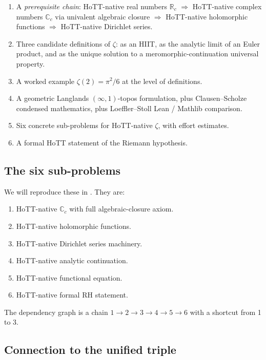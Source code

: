 \documentclass[12pt]{article}
\theoremstyle{definition}
\theoremstyle{remark}
\newcommand{\R}{\mathbb{R}}
\newcommand{\C}{\mathbb{C}}
\newcommand{\Rc}{\R_{c}}
\newcommand{\Cc}{\C_{c}}
\begin{document}
\begin{enumerate}[leftmargin=*]
\item A \emph{prerequisite chain}: HoTT-native real numbers $\Rc$
      $\Rightarrow$ HoTT-native complex numbers $\Cc$ via univalent
      algebraic closure $\Rightarrow$ HoTT-native holomorphic functions
      $\Rightarrow$ HoTT-native Dirichlet series.
\item Three candidate definitions of $\zeta$: as an HIIT, as the analytic
      limit of an Euler product, and as the unique solution to a
      meromorphic-continuation universal property.
\item A worked example $\zeta(2) = \pi^2/6$ at the level of definitions.
\item A geometric Langlands $(\infty,1)$-topos formulation, plus
      Clausen--Scholze condensed mathematics, plus Loeffler--Stoll
      Lean / Mathlib comparison.
\item Six concrete sub-problems for HoTT-native $\zeta$, with effort
      estimates.
\item A formal HoTT statement of the Riemann hypothesis.
\end{enumerate}

\subsection{The six sub-problems}

We will reproduce these in . They are:
\begin{enumerate}
\item HoTT-native $\Cc$ with full algebraic-closure axiom.
\item HoTT-native holomorphic functions.
\item HoTT-native Dirichlet series machinery.
\item HoTT-native analytic continuation.
\item HoTT-native functional equation.
\item HoTT-native formal RH statement.
\end{enumerate}
The dependency graph is a chain $1 \to 2 \to 3 \to 4 \to 5 \to 6$ with a
shortcut from 1 to 3.

\subsection{Connection to the unified triple}
\end{document}

